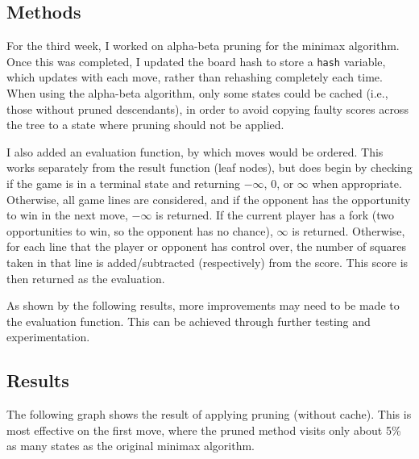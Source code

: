 \subsection{Methods}
For the third week, I worked on alpha-beta pruning for the minimax algorithm. Once this was completed, I updated the board hash to store a \texttt{hash} variable, which updates with each move, rather than rehashing completely each time. When using the alpha-beta algorithm, only some states could be cached (i.e., those without pruned descendants), in order to avoid copying faulty scores across the tree to a state where pruning should not be applied.

I also added an evaluation function, by which moves would be ordered. This works separately from the result function (leaf nodes), but does begin by checking if the game is in a terminal state and returning \(-\infty\), \(0\), or \(\infty\) when appropriate. Otherwise, all game lines are considered, and if the opponent has the opportunity to win in the next move, \(-\infty\) is returned. If the current player has a fork (two opportunities to win, so the opponent has no chance), \(\infty\) is returned. Otherwise, for each line that the player or opponent has control over, the number of squares taken in that line is added/subtracted (respectively) from the score. This score is then returned as the evaluation.

As shown by the following results, more improvements may need to be made to the evaluation function. This can be achieved through further testing and experimentation. 

\subsection{Results}

The following graph shows the result of applying pruning (without cache). This is most effective on the first move, where the pruned method visits only about 5\% as many states as the original minimax algorithm.

